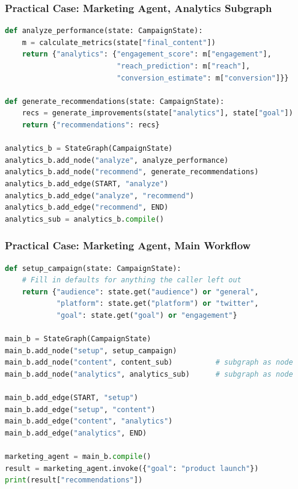 \begin{frame}[fragile]\frametitle{Practical Case: Marketing Agent, Analytics Subgraph}

\begin{lstlisting}[language=Python]
def analyze_performance(state: CampaignState):
    m = calculate_metrics(state["final_content"])
    return {"analytics": {"engagement_score": m["engagement"],
                          "reach_prediction": m["reach"],
                          "conversion_estimate": m["conversion"]}}

def generate_recommendations(state: CampaignState):
    recs = generate_improvements(state["analytics"], state["goal"])
    return {"recommendations": recs}

analytics_b = StateGraph(CampaignState)
analytics_b.add_node("analyze", analyze_performance)
analytics_b.add_node("recommend", generate_recommendations)
analytics_b.add_edge(START, "analyze")
analytics_b.add_edge("analyze", "recommend")
analytics_b.add_edge("recommend", END)
analytics_sub = analytics_b.compile()
\end{lstlisting}
\end{frame}
\begin{frame}[fragile]\frametitle{Practical Case: Marketing Agent, Main Workflow}

\begin{lstlisting}[language=Python]
def setup_campaign(state: CampaignState):
    # Fill in defaults for anything the caller left out
    return {"audience": state.get("audience") or "general",
            "platform": state.get("platform") or "twitter",
            "goal": state.get("goal") or "engagement"}

main_b = StateGraph(CampaignState)
main_b.add_node("setup", setup_campaign)
main_b.add_node("content", content_sub)          # subgraph as node
main_b.add_node("analytics", analytics_sub)      # subgraph as node

main_b.add_edge(START, "setup")
main_b.add_edge("setup", "content")
main_b.add_edge("content", "analytics")
main_b.add_edge("analytics", END)

marketing_agent = main_b.compile()
result = marketing_agent.invoke({"goal": "product launch"})
print(result["recommendations"])
\end{lstlisting}
\end{frame}
